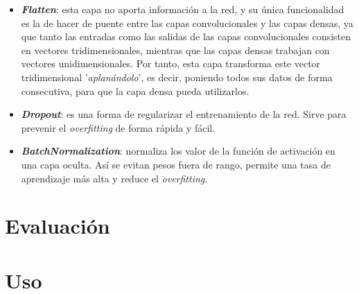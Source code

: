 \documentclass{uc3mpracticas}
\begin{document}
  \begin{itemize}
    \item \textbf{\textit{Flatten}}: esta capa no aporta información a la red, y su única funcionalidad es la de hacer de puente entre las capas convolucionales y las capas densas, ya que tanto las entradas como las salidas de las capas convolucionales consisten en vectores tridimensionales, mientras que las capas densas trabajan con vectores unidimensionales. Por tanto, esta capa transforma este vector tridimensional '\textit{aplanándolo}', es decir, poniendo todos sus datos de forma consecutiva, para que la capa densa pueda utilizarlos.

    \item \textbf{\textit{Dropout}}: es una forma de regularizar el entrenamiento de la red. Sirve para prevenir el \textit{overfitting} de forma rápida y fácil.

    \item \textbf{\textit{BatchNormalization}}: normaliza los valor de la función de activación en una capa oculta. Así se evitan pesos fuera de rango, permite una tasa de aprendizaje más alta y reduce el \textit{overfitting}.

  \end{itemize}



  \newpage

  \section{Evaluación}

  \newpage
  \section{Uso}
\end{document}
